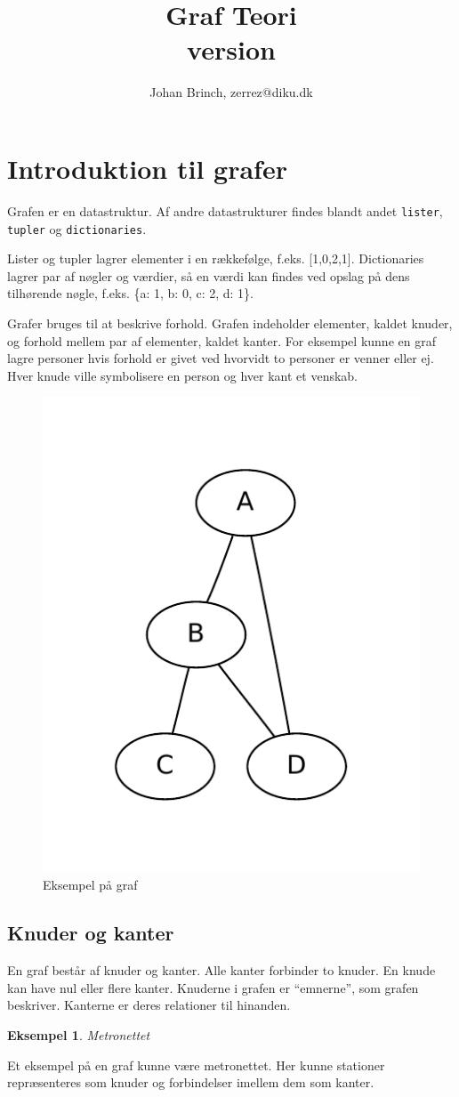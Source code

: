 \documentclass[10pt,a4paper,danish]{article}
\title{Graf Teori\\\small{version }}
\author{Johan Brinch, zerrez@diku.dk}
\newcommand{\ct}{\texttt}
\newtheorem{example}{Eksempel}[subsection]
\begin{document}
\maketitle
\newpage


\tableofcontents
\newpage

\section{Introduktion til grafer}
Grafen er en datastruktur. Af andre datastrukturer findes blandt andet
\ct{lister}, \ct{tupler} og \ct{dictionaries}.

Lister og tupler lagrer elementer i en rækkefølge,
f.eks. [1,0,2,1]. Dictionaries lagrer par af nøgler og værdier, så en
værdi kan findes ved opslag på dens tilhørende nøgle, f.eks. \{a: 1,
b: 0, c: 2, d: 1\}.

Grafer bruges til at beskrive forhold. Grafen indeholder elementer,
kaldet knuder, og forhold mellem par af elementer, kaldet kanter.  For
eksempel kunne en graf lagre personer hvis forhold er givet ved
hvorvidt to personer er venner eller ej. Hver knude ville symbolisere
en person og hver kant et venskab.


\begin{figure}[h]
\centering
\includegraphics[width=.3\textwidth]{graphs/graph0.pdf}
\caption{Eksempel på graf}
\label{fig:graph0}
\end{figure}


\subsection{Knuder og kanter}
En graf består af knuder og kanter. Alle kanter forbinder to
knuder. En knude kan have nul eller flere kanter. Knuderne i grafen er
"`emnerne"', som grafen beskriver. Kanterne er deres relationer til
hinanden.


\begin{example}Metronettet\end{example}
  Et eksempel på en graf kunne være metronettet. Her kunne stationer
  repræsenteres som knuder og forbindelser imellem dem som kanter.
\end{document}
